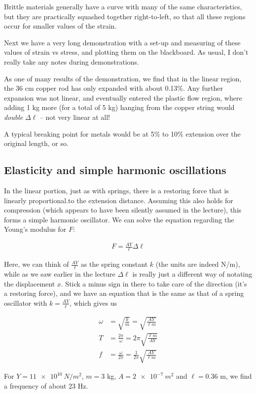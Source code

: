 Brittle materials generally have a curve with many of the same characteristics, but they are practically squashed together right-to-left, so that all these regions occur for smaller values of the strain.

Next we have a very long demonstration with a set-up and measuring of these values of strain vs stress, and plotting them on the blackboard. As usual, I don't really take any notes during demonstrations.

As one of many results of the demonstration, we find that in the linear region, the 36 cm copper rod has only expanded with about 0.13\%. Any further expansion was not linear, and eventually entered the plastic flow region, where adding 1 kg more (for a total of 5 kg) hanging from the copper string would \emph{double} $\Delta \ell$ -- not very linear at all!

A typical breaking point for metals would be at 5\% to 10\% extension over the original length, or so.

\subsection{Elasticity and simple harmonic oscillations}

In the linear portion, just as with springs, there is a restoring force that is linearly proportional.to the extension distance. Assuming this also holds for compression (which appears to have been silently assumed in the lecture), this forms a simple harmonic oscillator. We can solve the equation regarding the Young's modulus for $F$:

\begin{align}
F = \frac{A Y}{\ell} \Delta \ell
\end{align}

Here, we can think of $\displaystyle \frac{A Y}{\ell}$ as the spring constant $k$ (the units are indeed N/m), while as we saw earlier in the lecture $\Delta \ell$ is really just a different way of notating the displacement $x$. Stick a minus sign in there to take care of the direction (it's a restoring force), and we have an equation that is the same as that of a spring oscillator with $\displaystyle k = \frac{A Y}{\ell}$, which gives us

\begin{align}
\omega &= \sqrt{\frac{k}{m}} = \sqrt{\frac{A Y}{\ell m}}\\
T &= \frac{2 \pi}{\omega} = 2 \pi \sqrt{\frac{\ell m}{A Y}}\\
f &= \frac{\omega}{2 \pi} = \frac{1}{2\pi} \sqrt{\frac{A Y}{\ell m}}
\end{align}

For $Y = \SI{11e10}{N/m^2}$, $m = 3$ kg, $A = \SI{2e-7}{m^2}$ and $\ell = 0.36$ m, we find a frequency of about 23 Hz.

